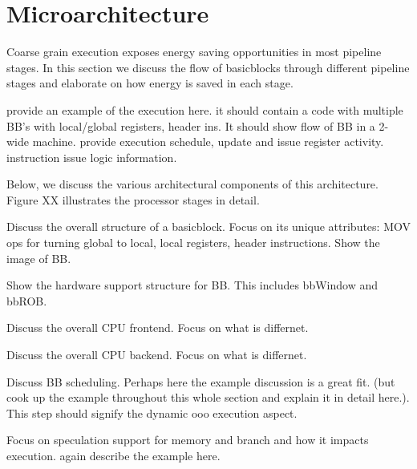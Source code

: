 \section{Microarchitecture}
\label{sec:arch}

Coarse grain execution exposes energy saving opportunities in most pipeline
stages. In this section we discuss the flow of basicblocks through different
pipeline stages and elaborate on how energy is saved in each stage.

provide an example of the execution here.  it should contain a code with
multiple BB's with local/global registers, header ins.  It should show flow of
BB in a 2-wide machine. provide execution schedule, update and issue register
activity. instruction issue logic information.

Below, we discuss the various architectural components of this architecture.
Figure XX illustrates the processor stages in detail.

Discuss the overall structure of a basicblock. Focus on its unique attributes:
MOV ops for turning global to local, local registers, header instructions. Show
the image of BB.


Show the hardware support structure for BB. This includes bbWindow and bbROB.


Discuss the overall CPU frontend. Focus on what is differnet.


Discuss the overall CPU backend. Focus on what is differnet.


Discuss BB scheduling. Perhaps here the example discussion is a great fit. (but
        cook up the example throughout this whole section and explain it in
        detail here.). This step should signify the dynamic ooo execution
aspect.


Focus on speculation support for memory and branch and how it impacts execution.
again describe the example here.



